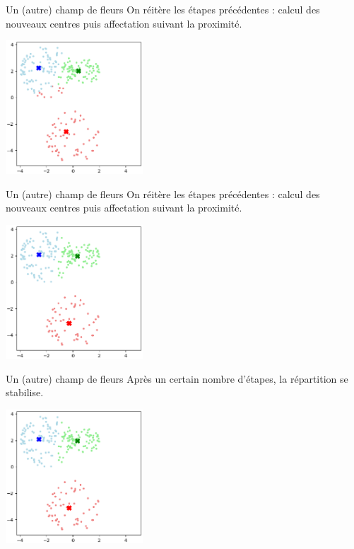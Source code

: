 \documentclass[10pt]{beamer}
\begin{document}
\begin{frame}{\Ctitle}{\stitle}
    \begin{exampleblock}{Un (autre) champ de fleurs}
        On réitère les étapes précédentes : calcul des nouveaux centres puis affectation suivant la proximité.
        \begin{center}
            \includegraphics[height=5cm]{ex2_kmeans4.eps}
        \end{center}
    \end{exampleblock}
\end{frame}

\begin{frame}{\Ctitle}{\stitle}
    \begin{exampleblock}{Un (autre) champ de fleurs}
        On réitère les étapes précédentes : calcul des nouveaux centres puis affectation suivant la proximité.
        \begin{center}
            \includegraphics[height=5cm]{ex2_kmeans6.eps}
        \end{center}
    \end{exampleblock}
\end{frame}

\begin{frame}{\Ctitle}{\stitle}
    \begin{exampleblock}{Un (autre) champ de fleurs}
        Après un certain nombre d'étapes, la répartition se stabilise.
        \begin{center}
            \includegraphics[height=5cm]{ex2_kmeans8.eps}
        \end{center}
    \end{exampleblock}
\end{frame}
\end{document}
